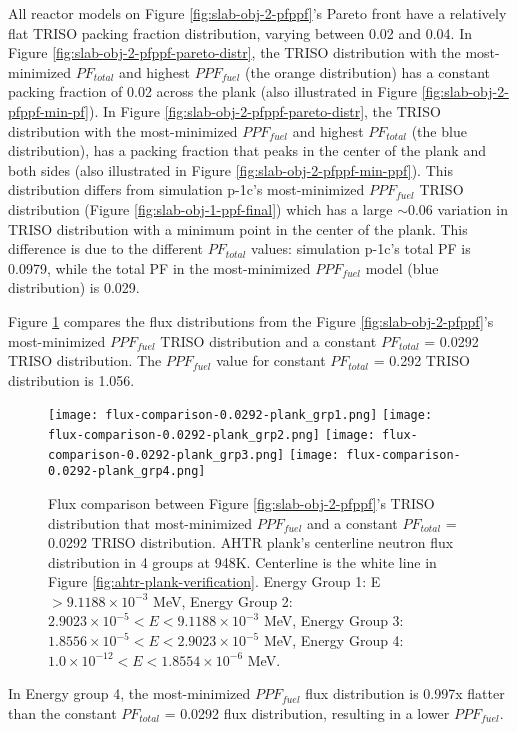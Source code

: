All reactor models on Figure \ref{fig:slab-obj-2-pfppf}'s Pareto front have a relatively 
flat TRISO packing fraction distribution, varying between 0.02 and 0.04. 
In Figure \ref{fig:slab-obj-2-pfppf-pareto-distr}, the TRISO distribution with the 
most-minimized $PF_{total}$ and highest $PPF_{fuel}$
(the orange distribution) has a constant packing fraction of 0.02 across the plank
(also illustrated in Figure \ref{fig:slab-obj-2-pfppf-min-pf}). 
In Figure \ref{fig:slab-obj-2-pfppf-pareto-distr}, the TRISO distribution with the 
most-minimized $PPF_{fuel}$ and highest $PF_{total}$
(the blue distribution), has a packing fraction that peaks in the center of the plank
and both sides (also illustrated in Figure \ref{fig:slab-obj-2-pfppf-min-ppf}). 
This distribution differs from simulation p-1c's most-minimized $PPF_{fuel}$ TRISO 
distribution (Figure \ref{fig:slab-obj-1-ppf-final}) which has a large $\sim 0.06$ 
variation in TRISO distribution with a minimum point in the center of the plank. 
This difference is due to the different $PF_{total}$ values: simulation p-1c's total PF 
is 0.0979, while the total PF in the most-minimized $PPF_{fuel}$ model 
(blue distribution) is 0.029. 

Figure \ref{fig:flux-comparison-0.0292-plank} compares the flux distributions from the 
Figure \ref{fig:slab-obj-2-pfppf}'s most-minimized $PPF_{fuel}$ TRISO distribution and a 
constant $PF_{total}$ = 0.0292 TRISO distribution. 
The $PPF_{fuel}$ value for constant $PF_{total}$ = 0.292 TRISO distribution is 1.056. 
\begin{figure}[H]
    \centering
    \texttt{[image: flux-comparison-0.0292-plank\_grp1.png]} 
    \texttt{[image: flux-comparison-0.0292-plank\_grp2.png]} 
    \texttt{[image: flux-comparison-0.0292-plank\_grp3.png]} 
    \texttt{[image: flux-comparison-0.0292-plank\_grp4.png]} 
    \caption{Flux comparison between Figure \ref{fig:slab-obj-2-pfppf}'s TRISO 
    distribution that most-minimized $PPF_{fuel}$ and a constant $PF_{total}$ = 0.0292
    TRISO distribution. 
    \acrfull{AHTR} plank's centerline neutron flux distribution in 4 groups at 948K. 
    Centerline is the white line in Figure \ref{fig:ahtr-plank-verification}.
    Energy Group 1: E $> 9.1188 \times 10^{-3}$ MeV, 
    Energy Group 2: $2.9023 \times 10^{-5} < E < 9.1188 \times 10^{-3}$ MeV,
    Energy Group 3:  $1.8556 \times 10^{-5} < E < 2.9023 \times 10^{-5}$ MeV,
    Energy Group 4:  $1.0 \times 10^{-12} < E < 1.8554 \times 10^{-6}$ MeV.}
    \label{fig:flux-comparison-0.0292-plank}
\end{figure}
In Energy group 4, the most-minimized $PPF_{fuel}$ flux distribution is 0.997x flatter 
than the constant $PF_{total}$ = 0.0292 flux distribution, resulting in a lower 
$PPF_{fuel}$. 

